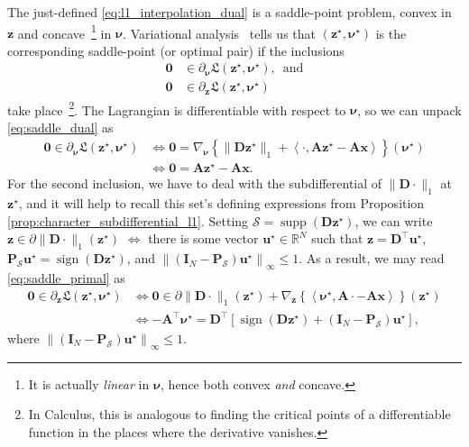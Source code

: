 The just-defined \eqref{eq:l1_interpolation_dual} is a saddle-point problem, convex in $\mathbf{z}$ and concave~\footnote{It is actually \emph{linear} in $\bm{\nu}$, hence both convex \emph{and} concave.} in $\bm{\nu}$. Variational analysis~\cite[Thm. 8.15]{rockafellar2009} tells us that $(\mathbf{z}^\star, \bm{\nu}^\star)$ is the corresponding saddle-point (or optimal pair) if the inclusions
\begin{align}
    \label{eq:saddle_dual} \mathbf{0} & \in \partial_{\bm{\nu}} \mathfrak{L}(\mathbf{z}^\star, \bm{\nu}^\star), \enspace \text{and}\\
    \label{eq:saddle_primal} \mathbf{0} & \in \partial_{\mathbf{z}} \mathfrak{L}(\mathbf{z}^\star, \bm{\nu}^\star)
\end{align}
take place~\footnote{In Calculus, this is analogous to finding the critical points of a differentiable function in the places where the derivative vanishes.}. The Lagrangian is differentiable with respect to $\bm{\nu}$, so we can unpack \eqref{eq:saddle_dual} as
\begin{align*}
    \mathbf{0} \in \partial_{\bm{\nu}} \mathfrak{L}(\mathbf{z}^\star, \bm{\nu}^\star) & \iff \mathbf{0} = \nabla_{\bm{\nu}} \left\{ \| \mathbf{D}\mathbf{z}^\star \|_1 + \left\langle \cdot, \mathbf{A}\mathbf{z}^\star - \mathbf{Ax}\right\rangle \right\} (\bm{\nu}^\star)\\
    & \iff \mathbf{0} = \mathbf{A}\mathbf{z}^\star - \mathbf{Ax}.
\end{align*}
For the second inclusion, we have to deal with the subdifferential of $\|\mathbf{D} \cdot \|_1$ at $\mathbf{z}^\star$, and it will help to recall this set's defining expressions from Proposition \ref{prop:character_subdifferential_l1}. Setting $\mathcal{S} = \operatorname{supp}\left ( \mathbf{D} \mathbf{z}^\star \right )$, we can write $\mathbf{z} \in \partial \|\mathbf{D} \cdot \|_1 (\mathbf{z}^\star)$ $\iff$ there is some vector $\mathbf{u}^\star \in \mathbb{R}^{N}$ such that $\mathbf{z} = \mathbf{D}^\top \mathbf{u}^\star$, $\mathbf{P}_{\mathcal{S}} \mathbf{u}^\star =  \operatorname{sign} \left ( \mathbf{D} \mathbf{z}^\star \right )$, and $\left\|(\mathbf{I}_N - \mathbf{P}_{\mathcal{S}}) \mathbf{u}^\star \right\|_\infty \leq 1$. As a result, we may read \eqref{eq:saddle_primal} as
\begin{align*}
    \mathbf{0} \in \partial_{\mathbf{z}} \mathfrak{L}(\mathbf{z}^\star, \bm{\nu}^\star) & \iff \mathbf{0} \in \partial \|\mathbf{D} \cdot \|_1 (\mathbf{z}^\star) + \nabla_{\mathbf{z}} \left\{ \left\langle \bm{\nu}^\star, \mathbf{A}\cdot - \mathbf{Ax}\right\rangle \right\} (\mathbf{z}^\star)\\
    & \iff -\mathbf{A}^{\top} \bm{\nu}^\star = \mathbf{D}^{\top} \left[ \operatorname{sign} \left ( \mathbf{D} \mathbf{z}^\star \right ) + \left ( \mathbf{I}_N - \mathbf{P}_{\mathcal{S}} \right ) \mathbf{u}^\star \right],
\end{align*}
where $\left\|(\mathbf{I}_N - \mathbf{P}_{\mathcal{S}}) \mathbf{u}^\star \right\|_\infty \leq 1$.

